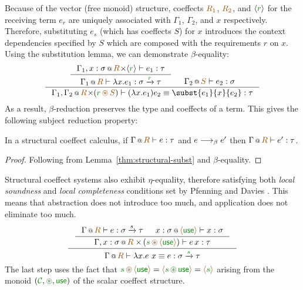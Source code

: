 Because of the vector (free monoid) structure, coeffects $\aclrd{R_1}$, $\aclrd{R_2}$, and 
$\langle{\cclrd{r}}\rangle$ for the receiving term $e_r$ are uniquely associated with $\Gamma_1$, $\Gamma_2$, and
$x$ respectively. Therefore, substituting $e_s$ (which has coeffects $S$) for $x$ introduces
the context dependencies specified by $S$ which are composed with the requirements $r$ on $x$. 
Using the substitution lemma, we can demonstrate $\beta$-equality:
%
\begin{equation*}
\inference{
  \inference{\coctx{\Gamma_1, x : \sigma}{\aclrd{R} \cons \langle{\cclrd{r}}\rangle} \vdash e_1 : \tau}
             {\coctx{\Gamma_1}{\aclrd{R}} \vdash \lambda x . e_1 : \sigma \xrightarrow{\cclrd{r}} \tau} &
           \coctx{\Gamma_2}{\aclrd{S}} \vdash e_2 : \sigma}
  {\coctx{\Gamma_1,\Gamma_2}{\aclrd{R} \cons (\cclrd{r} \,\aseq\, \aclrd{S})} \vdash (\lambda x . e_1) e_2 
\equiv
\subst{e_1}{x}{e_2} : \tau}
\end{equation*}
\noindent
As a result, $\beta$-reduction preserves the type and coeffects of a term.
This gives the following subject reduction property:

\begin{theorem}
In a structural coeffect calculus, if $\coctx{\Gamma}{\aclrd{R}} \vdash e : \tau$ and
$e \longrightarrow_\beta e'$ then $\coctx{\Gamma}{\aclrd{R}} \vdash e' : \tau$.
\end{theorem}
\begin{proof}
Following from Lemma~\ref{thm:structural-subst} and $\beta$-equality.  
\end{proof}

\noindent
Structural coeffect systems also exhibit $\eta$-equality, therefore satisfying both
\emph{local soundness} and \emph{local completeness} conditions set by Pfenning and Davies
\cite{logic-modal-reconstruction}. This means that abstraction does not introduce too much, 
and application does not eliminate too much.
%
\begin{equation*}
\inference{
  \inference 
    {\coctx{\Gamma}{\aclrd{R}} \vdash e : \sigma \xrightarrow{s} \tau & 
     \coctx{x:\sigma}{\alift{\cunit}} \vdash x : \sigma}
    {\coctx{\Gamma, x:\sigma}{\aclrd{R} \,\cons\, (\cclrd{s} \,\aseq\, \alift{\cunit})} \vdash e \, x : \tau}}
  {\coctx{\Gamma}{\aclrd{R}} \vdash \lambda x.e~x  \equiv e 
: \sigma \xrightarrow{\cclrd{s}} \tau}
\end{equation*}
%
The last step uses the fact that 
$\cclrd{s} \,\aseq\, \alift{\cunit} = \alift{\cclrd{s} \,\cseq\, \cunit} = \alift{\cclrd{s}}$ 
arising from the monoid $(\C, \cseq, \cunit)$ of the scalar coeffect structure.

